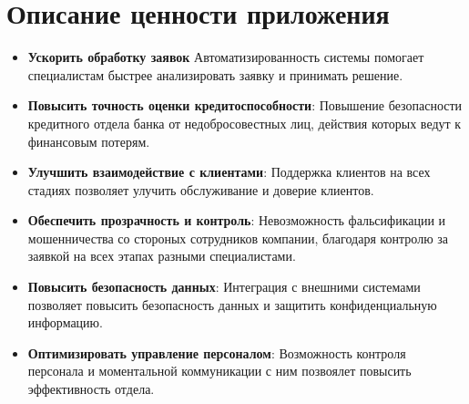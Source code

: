 \documentclass[20pt]{article}
\begin{document}
\section{Описание ценности приложения}

\begin{itemize}
    \item \textbf{Ускорить обработку заявок} Автоматизированность системы помогает специалистам быстрее анализировать заявку и принимать решение.
    \item \textbf{Повысить точность оценки кредитоспособности}: Повышение безопасности кредитного отдела банка от недобросовестных лиц, действия которых ведут к финансовым потерям.
    \item \textbf{Улучшить взаимодействие с клиентами}: Поддержка клиентов на всех стадиях позволяет улучить обслуживание и доверие клиентов.
    \item \textbf{Обеспечить прозрачность и контроль}: Невозможность фальсификации и мошенничества со стороных сотрудников компании, благодаря контролю за заявкой на всех этапах разными специалистами.
    \item \textbf{Повысить безопасность данных}: Интеграция с внешними системами позволяет повысить безопасность данных и защитить конфиденциальную информацию.
    \item \textbf{Оптимизировать управление персоналом}: Возможность контроля персонала и моментальной коммуникации с ним позвоялет повысить эффективность отдела.
\end{itemize}


\end{document}
